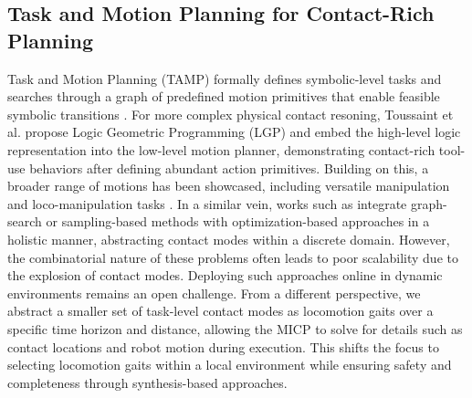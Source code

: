 \subsection{Task and Motion Planning for Contact-Rich Planning}
Task and Motion Planning (TAMP) formally defines symbolic-level tasks and searches through a graph of predefined motion primitives that enable feasible symbolic transitions \citep{garrett2021integrated, zhao2024survey}. For more complex physical contact resoning, Toussaint et al. propose Logic Geometric Programming (LGP) \citep{toussaint2015logic} and embed the high-level
logic representation into the low-level motion planner, demonstrating contact-rich tool-use behaviors \citep{toussaint2018differentiable}
after defining abundant action primitives. 
Building on this, a broader range of motions has been showcased, including versatile manipulation \citep{migimatsu2020object,zhao2021sydebo} and loco-manipulation tasks \citep{sleiman2023versatile}.
In a similar vein, works such as \citep{ding2021hybrid,shirai2021lto,jelavic2021combined,amatucci2022monte,chen2021trajectotree,zhang2023simultaneous,zhu2023efficient,asselmeier2024hierarchical} integrate graph-search or sampling-based methods with optimization-based approaches in a holistic manner, abstracting contact modes within a discrete domain. However, the combinatorial nature of these problems often leads to poor scalability due to the explosion of contact modes. Deploying such approaches online in dynamic environments remains an open challenge. From a different perspective, we abstract a smaller set of task-level contact modes as locomotion gaits over a specific time horizon and distance, allowing the MICP to solve for details such as contact locations and robot motion during execution. This shifts the focus to selecting locomotion gaits within a local environment while ensuring safety and completeness through synthesis-based approaches.

